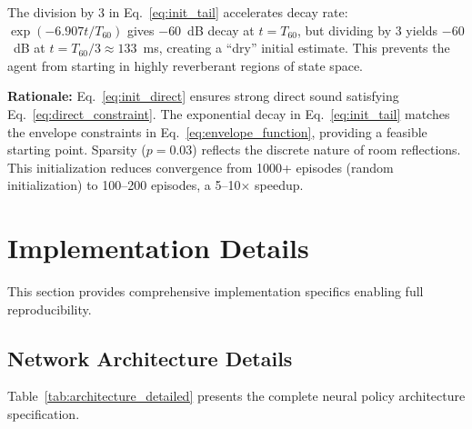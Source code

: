 \documentclass[12pt,a4paper]{article}
\begin{document}
The division by 3 in Eq.~\eqref{eq:init_tail} accelerates decay rate: $\exp(-6.907t/T_{60})$ gives $-60$~dB decay at $t=T_{60}$, but dividing by 3 yields $-60$~dB at $t=T_{60}/3 \approx 133$~ms, creating a ``dry'' initial estimate. This prevents the agent from starting in highly reverberant regions of state space.

\textbf{Rationale:} Eq.~\eqref{eq:init_direct} ensures strong direct sound satisfying Eq.~\eqref{eq:direct_constraint}. The exponential decay in Eq.~\eqref{eq:init_tail} matches the envelope constraints in Eq.~\eqref{eq:envelope_function}, providing a feasible starting point. Sparsity ($p=0.03$) reflects the discrete nature of room reflections. This initialization reduces convergence from 1000+ episodes (random initialization) to 100--200 episodes, a 5--10$\times$ speedup.

\section{Implementation Details}
\label{sec:implementation}

This section provides comprehensive implementation specifics enabling full reproducibility.

\subsection{Network Architecture Details}

Table~\ref{tab:architecture_detailed} presents the complete neural policy architecture specification.
\end{document}
